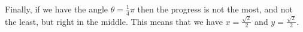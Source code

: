 \documentclass[preview]{standalone}
\begin{document}
\begin{center}
Finally, if we have the angle $\theta = \frac{1}{4} \pi$ then the progress is not the most, and not the least, but right in the middle. This means that we have $x=\frac{\sqrt{2}}{2}$ and $y=\frac{\sqrt{2}}{2}$.
\end{center}
\end{document}
